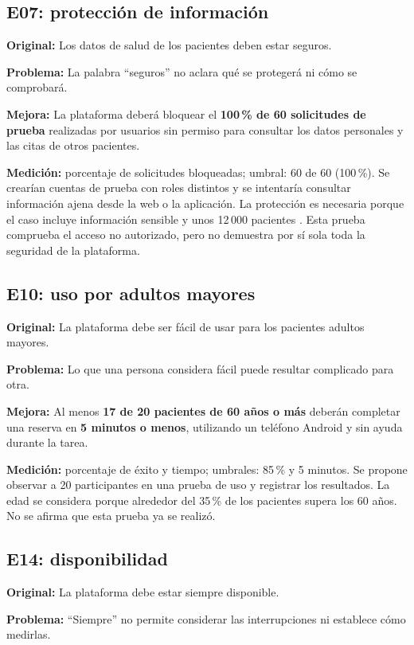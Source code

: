 \documentclass[conference,onecolumn]{IEEEtran}
\begin{document}
\subsection{E07: protección de información}
\textbf{Original:} Los datos de salud de los pacientes deben estar seguros.

\textbf{Problema:} La palabra \enquote{seguros} no aclara qué se protegerá ni cómo se comprobará.

\textbf{Mejora:} La plataforma deberá bloquear el \textbf{100\,\% de 60 solicitudes de prueba} realizadas por usuarios sin permiso para consultar los datos personales y las citas de otros pacientes.

\textbf{Medición:} porcentaje de solicitudes bloqueadas; umbral: 60 de 60 (100\,\%). Se crearían cuentas de prueba con roles distintos y se intentaría consultar información ajena desde la web o la aplicación. La protección es necesaria porque el caso incluye información sensible y unos 12\,000 pacientes \cite{LOPDP2021}. Esta prueba comprueba el acceso no autorizado, pero no demuestra por sí sola toda la seguridad de la plataforma.

\subsection{E10: uso por adultos mayores}
\textbf{Original:} La plataforma debe ser fácil de usar para los pacientes adultos mayores.

\textbf{Problema:} Lo que una persona considera fácil puede resultar complicado para otra.

\textbf{Mejora:} Al menos \textbf{17 de 20 pacientes de 60 años o más} deberán completar una reserva en \textbf{5 minutos o menos}, utilizando un teléfono Android y sin ayuda durante la tarea.

\textbf{Medición:} porcentaje de éxito y tiempo; umbrales: 85\,\% y 5 minutos. Se propone observar a 20 participantes en una prueba de uso y registrar los resultados. La edad se considera porque alrededor del 35\,\% de los pacientes supera los 60 años. No se afirma que esta prueba ya se realizó.

\subsection{E14: disponibilidad}
\textbf{Original:} La plataforma debe estar siempre disponible.

\textbf{Problema:} \enquote{Siempre} no permite considerar las interrupciones ni establece cómo medirlas.
\end{document}
